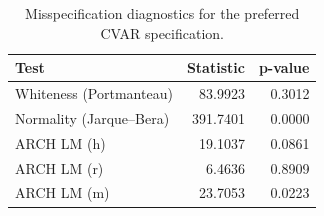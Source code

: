 \begin{table}[H]
\centering
\caption{Misspecification diagnostics for the preferred CVAR specification.}
\label{tab:diagnostics}
\begin{tabular}{lrr}
\toprule
Test & Statistic & p-value \\
\midrule
Whiteness (Portmanteau) & 83.9923 & 0.3012 \\
Normality (Jarque--Bera) & 391.7401 & 0.0000 \\
ARCH LM (h) & 19.1037 & 0.0861 \\
ARCH LM (r) & 6.4636 & 0.8909 \\
ARCH LM (m) & 23.7053 & 0.0223 \\
\bottomrule
\end{tabular}
\end{table}
